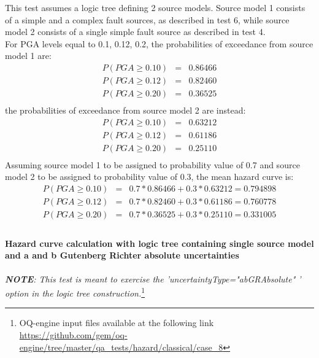 This test assumes a logic tree defining 2 source models. Source model 1 consists
of a simple and a complex fault sources, as described in test 6, while source
model 2 consists of a single simple fault source as described in test 4.\\ For
PGA levels equal to 0.1, 0.12, 0.2, the probabilities of exceedance from source
model 1 are:
\begin{eqnarray}
P(PGA \geq 0.10) &=& 0.86466 \nonumber \\
P(PGA \geq 0.12) &=& 0.82460 \nonumber \\
P(PGA \geq 0.20) &=& 0.36525 \nonumber \\
\end{eqnarray}
the probabilities of exceedance from source model 2 are instead:
\begin{eqnarray}
P(PGA \geq 0.10) &=& 0.63212 \nonumber \\
P(PGA \geq 0.12) &=& 0.61186 \nonumber \\
P(PGA \geq 0.20) &=& 0.25110 \nonumber \\
\end{eqnarray}
Assuming source model 1 to be assigned to probability value of 0.7 and source model 2 to be assigned to probability value of 0.3, the mean hazard curve is:
\begin{eqnarray}
P(PGA \geq 0.10) &=& 0.7 * 0.86466 + 0.3 * 0.63212 = 0.794898\nonumber \\
P(PGA \geq 0.12) &=& 0.7 * 0.82460 + 0.3 * 0.61186 = 0.760778\nonumber \\
P(PGA \geq 0.20) &=& 0.7 * 0.36525 + 0.3 * 0.25110 = 0.331005\nonumber \\
\end{eqnarray}
\clearpage
%
\clearpage
%
\paragraph{Hazard curve calculation with logic tree containing single
source model and a and b Gutenberg Richter absolute uncertainties}
\textit{\textbf{NOTE}: This test is meant to exercise the
'uncertaintyType="abGRAbsolute" ' option in the logic tree construction.}\footnote{
    OQ-engine input files available at the following link
    \url{https://github.com/gem/oq-engine/tree/master/qa_tests/hazard/classical/case_8}} 

